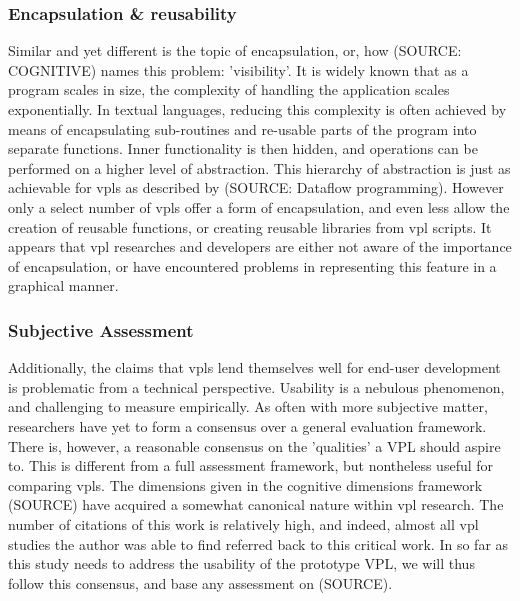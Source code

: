 \subsubsection*{Encapsulation \& reusability}
Similar and yet different is the topic of encapsulation, or, how (SOURCE: COGNITIVE) names this problem: 'visibility'.
It is widely known that as a program scales in size, the complexity of handling the application scales exponentially.
In textual languages, reducing this complexity is often achieved by means of encapsulating sub-routines and re-usable parts of the program into separate functions.
Inner functionality is then hidden, and operations can be performed on a higher level of abstraction. 
This hierarchy of abstraction is just as achievable for \ac{vpl}s as described by (SOURCE: Dataflow programming).
However only a select number of \ac{vpl}s offer a form of encapsulation, and even less allow the creation of reusable functions, or creating reusable libraries from vpl scripts.
It appears that \ac{vpl} researches and developers are either not aware of the importance of encapsulation, or have encountered problems in representing this feature in a graphical manner.


\subsubsection*{Subjective Assessment}
Additionally, the claims that \ac{vpl}s lend themselves well for end-user development is problematic from a technical perspective. 
Usability is a nebulous phenomenon, and challenging to measure empirically.
As often with more subjective matter, researchers have yet to form a consensus over a general evaluation framework. 
There is, however, a reasonable consensus on the 'qualities' a VPL should aspire to. 
This is different from a full assessment framework, but nontheless useful for comparing \ac{vpl}s.
The dimensions given in the cognitive dimensions framework (SOURCE) have acquired a somewhat canonical nature within \ac{vpl} research.
The number of citations of this work is relatively high, and indeed, almost all \ac{vpl} studies the author was able to find referred back to this critical work.   
In so far as this study needs to address the usability of the prototype VPL, we will thus follow this consensus, and base any assessment on (SOURCE).


